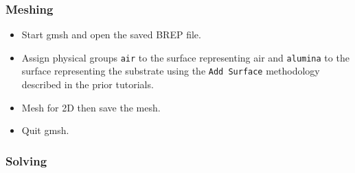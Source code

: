 \documentclass[titlepage]{article}
\renewcommand\_{\textunderscore\linebreak[1]}
\begin{document}
\subsubsection{Meshing}

\begin{itemize}
\item Start gmsh and open the saved BREP file.
\item Assign physical groups \texttt{air} to the surface representing air and \texttt{alumina} to the surface representing the substrate using the \texttt{Add Surface} methodology described in the prior tutorials.
\item Mesh for 2D then save the mesh.
\item Quit gmsh.

\end{itemize}

\subsubsection{Solving}
\end{document}
